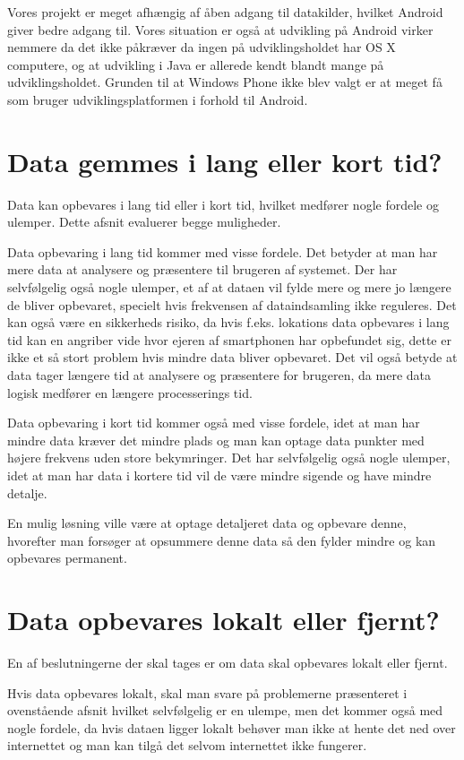 Vores projekt er meget afhængig af åben adgang til datakilder, hvilket Android giver bedre adgang til. Vores situation er også at udvikling på Android virker nemmere da det ikke påkræver da ingen på udviklingsholdet har OS X computere, og at udvikling i Java er allerede kendt blandt mange på udviklingsholdet. Grunden til at Windows Phone ikke blev valgt er at meget få som bruger udviklingsplatformen i forhold til Android.

\section{Data gemmes i lang eller kort tid?}
Data kan opbevares i lang tid eller i kort tid, hvilket medfører nogle fordele og ulemper. Dette afsnit evaluerer begge muligheder.

Data opbevaring i lang tid kommer med visse fordele. Det betyder at man har mere data at analysere og præsentere til brugeren af systemet.  
Der har selvfølgelig også nogle ulemper, et af at dataen vil fylde mere og mere jo længere de bliver opbevaret, specielt hvis frekvensen af dataindsamling ikke reguleres. Det kan også være en sikkerheds risiko, da hvis f.eks. lokations data opbevares i lang tid kan en angriber vide hvor ejeren af smartphonen har opbefundet sig, dette er ikke et så stort problem hvis mindre data bliver opbevaret. Det vil også betyde at data tager længere tid at analysere og præsentere for brugeren, da mere data logisk medfører en længere processerings tid.

Data opbevaring i kort tid kommer også med visse fordele, idet at man har mindre data kræver det mindre plads og man kan optage data punkter med højere frekvens uden store bekymringer. %
Det har selvfølgelig også nogle ulemper, idet at man har data i kortere tid vil de være mindre sigende og have mindre detalje. %

En mulig løsning ville være at optage detaljeret data og opbevare denne, hvorefter man forsøger at opsummere denne data så den fylder mindre og kan opbevares permanent. %

\section{Data opbevares lokalt eller fjernt?}
En af beslutningerne der skal tages er om data skal opbevares lokalt eller fjernt. 

Hvis data opbevares lokalt, skal man svare på problemerne præsenteret i ovenstående afsnit hvilket selvfølgelig er en ulempe, men det kommer også med nogle fordele, da hvis dataen ligger lokalt behøver man ikke at hente det ned over internettet og man kan tilgå det selvom internettet ikke fungerer.

